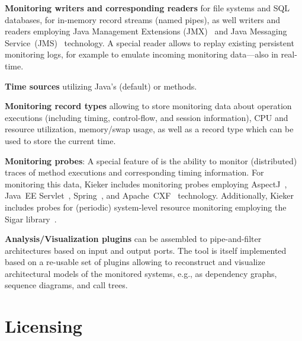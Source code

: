 \begin{compactitem}
 \item \textbf{Monitoring writers and corresponding readers} for %
file systems and SQL databases, %
for in-memory record streams (named pipes), %
as well writers and readers employing Java Management %
Extensions (JMX)~\cite{JMX-Website} and %
Java Messaging Service~(JMS)~\cite{JMS-WebSite} technology. %
A special reader allows to replay existing persistent %
monitoring logs, for example to emulate incoming monitoring %
data---also in real-time.
 \item \textbf{Time sources} utilizing Java's  (default) %
or  methods.
 \item \textbf{Monitoring record types} allowing to store %
monitoring data about operation executions (including timing, control-flow, %
and session information), CPU and resource utilization, memory/swap usage, as well as %
a record type which can be used to store the current time.
\item \textbf{Monitoring probes}: A special feature of \Kieker{} is the ability to monitor (distributed) %
traces of method executions and corresponding timing information. %
For monitoring this data, Kieker includes monitoring probes employing %
AspectJ~\cite{AspectJ-WebSite}, %
Java~EE Servlet~\cite{JavaServletTechnology-WebSite}, %
Spring~\cite{Spring-WebSite}, and %
Apache~CXF~\cite{CXF-WebSite} technology. %
Additionally, Kieker includes probes for (periodic) system-level resource %
monitoring employing the Sigar library~\cite{HypericSigarWebsite}.
\item \textbf{Analysis/Visualization plugins} can be assembled to %
pipe-and-filter architectures based on input and output ports. The %
\KiekerTraceAnalysis{} tool 
is itself implemented based on a re-usable set of \KiekerAnalysisPart{} %
plugins allowing to reconstruct and visualize architectural models of the %
monitored systems, e.g., as dependency graphs, sequence diagrams, and call %
trees. %
\end{compactitem}




\section{Licensing}

